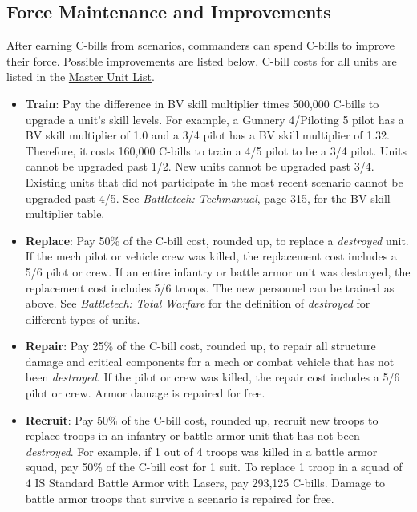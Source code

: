 \documentclass[UTF8]{article}
\begin{document}
\newpage

\subsection{Force Maintenance and Improvements}

After earning C-bills from scenarios, commanders can spend C-bills to improve their force.
Possible improvements are listed below.
C-bill costs for all units are listed in the \href{http://www.masterunitlist.info/}{Master Unit List}.\\

\begin{itemize}

\item {\bf Train}: Pay the difference in BV skill multiplier times 500,000 C-bills to upgrade a unit's skill levels.
For example, a Gunnery 4/Piloting 5 pilot has a BV skill multiplier of 1.0 and a 3/4 pilot has a BV skill multiplier of 1.32.
Therefore, it costs 160,000 C-bills to train a 4/5 pilot to be a 3/4 pilot.
Units cannot be upgraded past 1/2.
New units cannot be upgraded past 3/4.
Existing units that did not participate in the most recent scenario cannot be upgraded past 4/5.
See \emph{Battletech: Techmanual}, page 315, for the BV skill multiplier table.

\item {\bf Replace}: Pay 50\% of the C-bill cost, rounded up, to replace a \emph{destroyed} unit.
If the mech pilot or vehicle crew was killed, the replacement cost includes a 5/6 pilot or crew.
If an entire infantry or battle armor unit was destroyed, the replacement cost includes 5/6 troops.
The new personnel can be trained as above.
See \emph{Battletech: Total Warfare} for the definition of \emph{destroyed} for different types of units.

\item {\bf Repair}: Pay 25\% of the C-bill cost, rounded up, to repair all structure damage and critical components for a mech or combat vehicle that has not been \emph{destroyed}.
If the pilot or crew was killed, the repair cost includes a 5/6 pilot or crew.
Armor damage is repaired for free.

\item {\bf Recruit}: Pay 50\% of the C-bill cost, rounded up, recruit new troops to replace troops in an infantry or battle armor unit that has not been \emph{destroyed}.
For example, if 1 out of 4 troops was killed in a battle armor squad, pay 50\% of the C-bill cost for 1 suit.
To replace 1 troop in a squad of 4 IS Standard Battle Armor with Lasers, pay 293,125 C-bills.
Damage to battle armor troops that survive a scenario is repaired for free.


\end{itemize}
\end{document}

